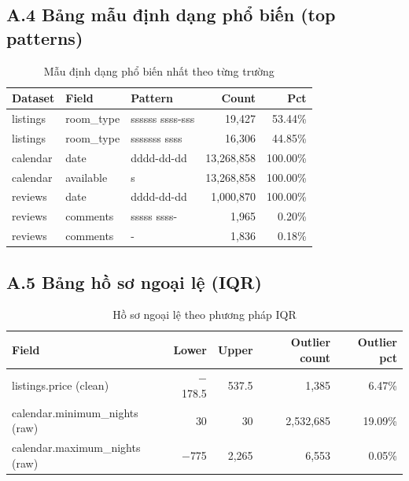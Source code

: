 \subsection*{A.4 Bảng mẫu định dạng phổ biến (top patterns)}

\begin{table}[H]
\centering
\caption{Mẫu định dạng phổ biến nhất theo từng trường}\label{tab:A4}
\begin{tabular}{|l|l|l|r|r|}
\hline
\textbf{Dataset} & \textbf{Field} & \textbf{Pattern} & \textbf{Count} & \textbf{Pct} \\
\hline
listings & room\_type & ssssss ssss-sss  & 19,427     & 53.44\% \\ \hline

listings & room\_type & sssssss ssss     & 16,306     & 44.85\% \\ \hline

calendar & date       & dddd-dd-dd       & 13,268,858 & 100.00\% \\ \hline

calendar & available  & s                & 13,268,858 & 100.00\% \\ \hline

reviews  & date       & dddd-dd-dd       & 1,000,870  & 100.00\% \\ \hline

reviews  & comments   & sssss ssss-      & 1,965      & 0.20\% \\ \hline

reviews  & comments   & -                & 1,836      & 0.18\% \\
\hline
\end{tabular}
\end{table}

\subsection*{A.5 Bảng hồ sơ ngoại lệ (IQR)}

\begin{table}[H]
\centering
\caption{Hồ sơ ngoại lệ theo phương pháp IQR}\label{tab:A5}
\begin{tabular}{|l|r|r|r|r|}
\hline
\textbf{Field} & \textbf{Lower} & \textbf{Upper} & \textbf{Outlier count} & \textbf{Outlier pct} \\
\hline
listings.price (clean)         & $-$178.5  & 537.5  & 1,385     & 6.47\% \\ \hline

calendar.minimum\_nights (raw) & 30        & 30     & 2,532,685 & 19.09\% \\ \hline

calendar.maximum\_nights (raw) & $-$775    & 2,265  & 6,553     & 0.05\% \\

\hline
\end{tabular}
\end{table}

